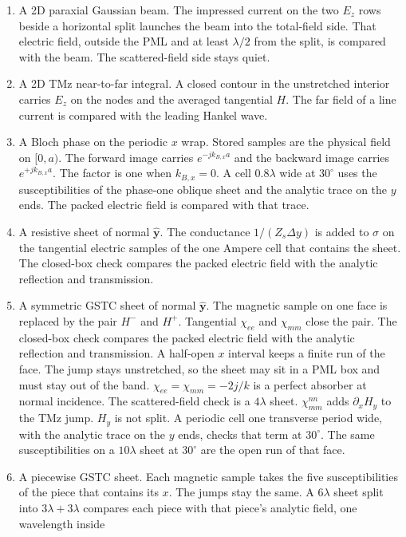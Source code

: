 \documentclass[11pt,a4paper]{article}
\begin{document}
\begin{enumerate}
outgoing spherical wave.
\item A 2D paraxial Gaussian beam. The impressed current on the two
$E_z$ rows beside a horizontal split launches the beam into the
total-field side. That electric field, outside the PML and at least
$\lambda/2$ from the split, is compared with the beam. The
scattered-field side stays quiet.
\item A 2D TMz near-to-far integral. A closed contour in the unstretched
interior carries $E_z$ on the nodes and the averaged tangential $H$.
The far field of a line current is compared with the leading Hankel
wave.
\item A Bloch phase on the periodic $x$ wrap. Stored samples are the
physical field on $[0,a)$. The forward image carries $e^{-j k_{B,x} a}$
and the backward image carries $e^{+j k_{B,x} a}$. The factor is one
when $k_{B,x}=0$. A cell $0.8\lambda$ wide at $30^\circ$ uses the
susceptibilities of the phase-one oblique sheet and the analytic trace
on the $y$ ends. The packed electric field is compared with that trace.
\item A resistive sheet of normal $\hat{\mathbf{y}}$. The conductance
$1/(Z_s\Delta y)$ is added to $\sigma$ on the tangential electric samples
of the one Ampere cell that contains the sheet. The closed-box check
compares the packed electric field with the analytic reflection and
transmission.
\item A symmetric GSTC sheet of normal $\hat{\mathbf{y}}$. The magnetic
sample on one face is replaced by the pair $H^-$ and $H^+$. Tangential
$\chi_{ee}$ and $\chi_{mm}$ close the pair. The closed-box check compares
the packed electric field with the analytic reflection and transmission.
A half-open $x$ interval keeps a finite run of the face. The jump stays
unstretched, so the sheet may sit in a PML box and must stay out of the
band. $\chi_{ee}=\chi_{mm}=-2j/k$ is a perfect absorber at normal incidence.
The scattered-field check is a $4\lambda$ sheet. $\chi_{mm}^{nn}$ adds
$\partial_x H_y$ to the TMz jump. $H_y$ is not split. A periodic cell one
transverse period wide, with the analytic trace on the $y$ ends, checks
that term at $30^\circ$. The same susceptibilities on a $10\lambda$ sheet
at $30^\circ$ are the open run of that face.
\item A piecewise GSTC sheet. Each magnetic sample takes the five
susceptibilities of the piece that contains its $x$. The jumps stay
the same. A $6\lambda$ sheet split into $3\lambda+3\lambda$ compares
each piece with that piece's analytic field, one wavelength inside

\end{enumerate}
\end{document}
